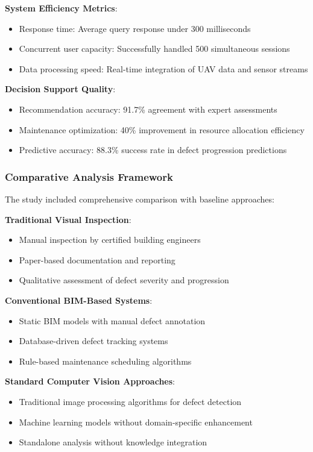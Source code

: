 \textbf{System Efficiency Metrics}:
\begin{itemize}
    \item Response time: Average query response under 300 milliseconds
    \item Concurrent user capacity: Successfully handled 500 simultaneous sessions
    \item Data processing speed: Real-time integration of UAV data and sensor streams
\end{itemize}

\textbf{Decision Support Quality}:
\begin{itemize}
    \item Recommendation accuracy: 91.7\% agreement with expert assessments
    \item Maintenance optimization: 40\% improvement in resource allocation efficiency
    \item Predictive accuracy: 88.3\% success rate in defect progression predictions
\end{itemize}

\subsubsection{Comparative Analysis Framework}

The study included comprehensive comparison with baseline approaches:

\textbf{Traditional Visual Inspection}:
\begin{itemize}
    \item Manual inspection by certified building engineers
    \item Paper-based documentation and reporting
    \item Qualitative assessment of defect severity and progression
\end{itemize}

\textbf{Conventional BIM-Based Systems}:
\begin{itemize}
    \item Static BIM models with manual defect annotation
    \item Database-driven defect tracking systems
    \item Rule-based maintenance scheduling algorithms
\end{itemize}

\textbf{Standard Computer Vision Approaches}:
\begin{itemize}
    \item Traditional image processing algorithms for defect detection
    \item Machine learning models without domain-specific enhancement
    \item Standalone analysis without knowledge integration
\end{itemize}

